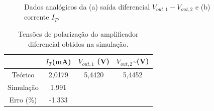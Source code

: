 \documentclass[a4paper,12pt,oneside,openany,table,xcdraw]{article}
\begin{document}
\begin{figure}[H]
\center
{}\hfill
{}
\caption{Dados analógicos da (a) saída diferencial $V_{out,1} - V_{out,2}$ e (b) corrente $I_{T}$.}
\label{sim:conclusoes}
\end{figure}

\vspace{0.3cm}
\begin{table} [H]
\centering
\def\arraystretch{1.38}
\caption{Tensões de polarização do amplificador diferencial obtidos na simulação.} \label{sim:dados}
\label{dados}
\begin{tabular}{|c|c|c|c|} 
\hhline{~---|}
\multicolumn{1}{c|}{}                         & {\cellcolor[rgb]{0.937,0.937,0.937}}\textbf{$I_{T}$(mA)}  & {\cellcolor[rgb]{0.937,0.937,0.937}}\textbf{$V_{out, 1}$ (V)}  & {\cellcolor[rgb]{0.937,0.937,0.937}}\textbf{$V_{out, 2}$\textasciitilde{}(V)}   \\ 
\hline
{\cellcolor[rgb]{0.937,0.937,0.937}}Teórico   & 2,0179                                                    & 5,4420                                                         & 5,4452                                                                          \\ 
\hline
{\cellcolor[rgb]{0.937,0.937,0.937}}Simulação &  1,991                                                         &                                                                &                                                                                 \\ 
\hline
{\cellcolor[rgb]{0.937,0.937,0.937}}Erro (\%) &  -1.333                                                         &                                                                &                                                                                 \\
\hline
\end{tabular}
\end{table}
\end{document}
